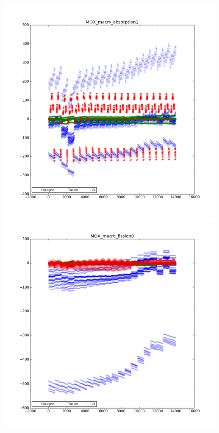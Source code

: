\begin{center}
\begin{figure}[h]
   \begin{minipage}[b]{0.5\linewidth}
      \centering \includegraphics[scale=0.3]{images/MOX/MOX_macro_absorption1.png}
   \end{minipage}
   \begin{minipage}[b]{0.5\linewidth}
      \centering \includegraphics[scale=0.3]{images/MOX/MOX_macro_fission0.png}

\end{minipage}
\end{figure}
\end{center}

